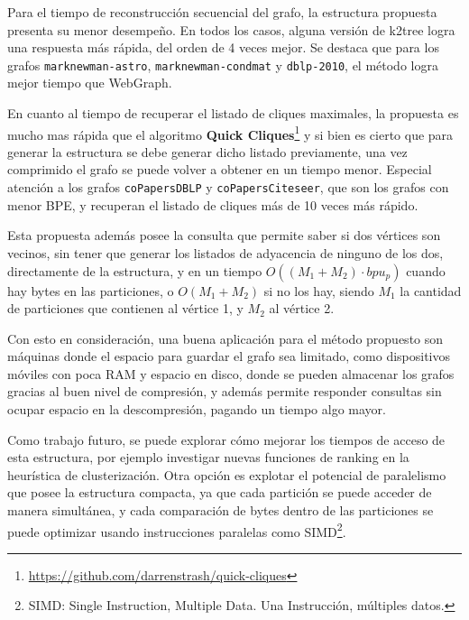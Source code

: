 Para el tiempo de reconstrucción secuencial del grafo, la estructura propuesta presenta su menor desempeño. En todos los casos, alguna versión de k2tree logra una respuesta más rápida, del orden de 4 veces mejor. Se destaca que para los grafos \texttt{marknewman-astro}, \texttt{marknewman-condmat} y \texttt{dblp-2010}, el método logra mejor tiempo que WebGraph.

En cuanto al tiempo de recuperar el listado de cliques maximales, la propuesta es mucho mas rápida que el algoritmo \textbf{Quick Cliques}\footnote{\url{https://github.com/darrenstrash/quick-cliques}} y si bien es cierto que para generar la estructura se debe generar dicho listado previamente, una vez comprimido el grafo se puede volver a obtener en un tiempo menor. Especial atención a los grafos \texttt{coPapersDBLP} y \texttt{coPapersCiteseer}, que son los grafos con menor BPE, y recuperan el listado de cliques más de 10 veces más rápido.

Esta propuesta además posee la consulta que permite saber si dos vértices son vecinos, sin tener que generar los listados de adyacencia de ninguno de los dos, directamente de la estructura, y en un tiempo  $O((M_{1} + M_{2}) \cdot bpu_{p})$ cuando hay bytes en las particiones, o $O(M_{1} + M_{2})$ si no los hay, siendo $M_{1}$ la cantidad de particiones que contienen al vértice 1, y $M_{2}$ al vértice 2. 

Con esto en consideración, una buena aplicación para el método propuesto son máquinas donde el espacio para guardar el grafo sea limitado, como dispositivos móviles con poca RAM y espacio en disco, donde se pueden almacenar los grafos gracias al buen nivel de compresión, y además permite responder consultas sin ocupar espacio en la descompresión, pagando un tiempo algo mayor.

Como trabajo futuro, se puede explorar cómo mejorar los tiempos de acceso de esta estructura, por ejemplo investigar nuevas funciones de ranking en la heurística de clusterización. Otra opción es explotar el potencial de paralelismo que posee la estructura compacta, ya que cada partición se puede acceder de manera simultánea, y cada comparación de bytes dentro de las particiones se puede optimizar usando instrucciones paralelas como SIMD\footnote{SIMD: Single Instruction, Multiple Data. Una Instrucción, múltiples datos.}.

